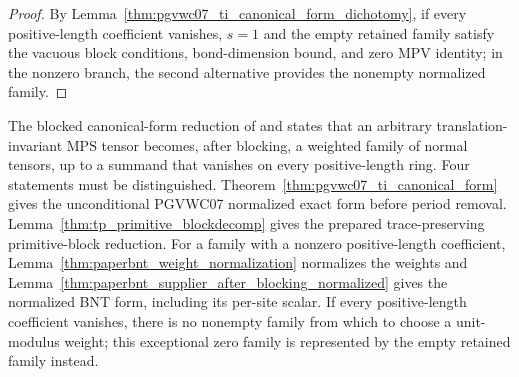 \begin{proof}\leanok
    By Lemma~\ref{thm:pgvwc07_ti_canonical_form_dichotomy}, if every
    positive-length coefficient vanishes, $s=1$ and the empty retained
    family satisfy the vacuous block conditions, bond-dimension bound, and
    zero MPV identity; in the nonzero branch, the second alternative provides
    the nonempty normalized family.
\end{proof}

\begin{remark}%
    \label{rem:cpgsv_canonical_form_source}
    The blocked canonical-form reduction of
    \cite[Section~2.3]{Cirac2016MPDO_arXiv} and
    \cite[Section~IV.A]{Cirac2021Matrix} states that an arbitrary
    translation-invariant MPS tensor becomes, after blocking, a weighted family
    of normal tensors, up to a summand that vanishes on every positive-length
    ring. Four statements must be distinguished. Theorem~\ref{thm:pgvwc07_ti_canonical_form}
    gives the unconditional PGVWC07 normalized exact form before period removal.
    Lemma~\ref{thm:tp_primitive_blockdecomp} gives the prepared
    trace-preserving primitive-block reduction. For a family with a nonzero
    positive-length coefficient,
    Lemma~\ref{thm:paperbnt_weight_normalization} normalizes the weights and
    Lemma~\ref{thm:paperbnt_supplier_after_blocking_normalized} gives the
    normalized BNT form, including its per-site scalar. If every
    positive-length coefficient vanishes, there is no nonempty family from
    which to choose a unit-modulus weight; this exceptional zero family is
    represented by the empty retained family instead.
\end{remark}
